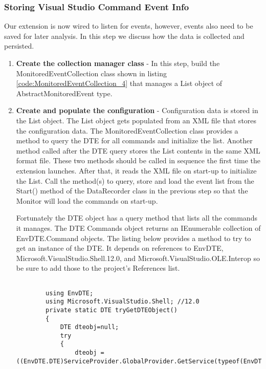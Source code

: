 \subsubsection{Storing Visual Studio Command Event Info}

Our extension is now wired to listen for events, however, events also need to be saved for later analysis. In this step we discuss how the data is collected and persisted.

\begin{enumerate}
\item {\bf Create the collection manager class} -
In this step, build the MonitoredEventCollection class shown in listing \ref{code:MonitoredEventCollection_4} that manages a List object of AbstractMonitoredEvent type.  

\item {\bf Create and populate the configuration} -
Configuration data is stored in the List object.
The List object gets populated from an XML file that stores the configuration data.  The MonitoredEventCollection class provides a method to query the DTE for all commands and initialize the list.  
Another method called after the DTE query stores the List contents in the same XML format file.  These two methods should be called in sequence the first time the extension launches. After that, it  reads the XML file on start-up to initialize the List.  Call the method(s) to query, store and load the event list from the Start() method of the DataRecorder class in the previous step so that the Monitor will load the commands on start-up.

Fortunately the DTE object has a query method that lists all the commands it manages.   The DTE Commands object returns an IEnumerable collection of EnvDTE.Command objects. The listing below provides a method to try to get an instance of the DTE.  It depends on references to EnvDTE, Microsoft.VisualStudio.Shell.12.0, and Microsoft.VisualStudio.OLE.Interop so be sure to add those to the project's References list.

\begin{lstlisting}

		using EnvDTE;
		using Microsoft.VisualStudio.Shell; //12.0
		private static DTE tryGetDTEObject()
		{
			DTE dteobj=null;
			try
			{
				dteobj = ((EnvDTE.DTE)ServiceProvider.GlobalProvider.GetService(typeof(EnvDTE.DTE).GUID)).DTE;


\end{lstlisting}
\end{enumerate}
